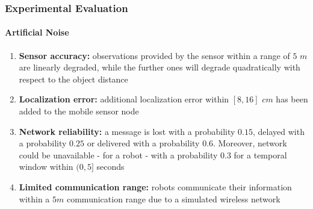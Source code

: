 \begin{frame}
	\frametitle{Experimental Evaluation}
	\framesubtitle{Artificial Noise}
	
	\large
	
	\vspace{0.3cm}
	
	\begin{enumerate}
		\item \textbf{Sensor accuracy:} observations provided by the sensor within a range of
			  $ 5 $ $ m $ are linearly degraded, while the further ones will degrade
			  quadratically with respect to the object distance
		\vspace{0.1cm}
		\item \textbf{Localization error: } additional localization error within $ [8,16] $
			  $ cm $ has been added to the mobile sensor node
		\vspace{0.1cm}
		\item \textbf{Network reliability:} a message is lost with a probability $ 0.15 $,
			  delayed with a probability $ 0.25 $ or delivered with a probability $ 0.6 $.
			  Moreover, network could be unavailable - for a robot - with a probability $ 0.3 $
			  for a temporal window within $ (0,5] $ seconds
		\vspace{0.1cm}
		\item \textbf{Limited communication range:} robots communicate their information within
			  a $ 5m $ communication range due to a simulated wireless network
	\end{enumerate}
\end{frame}

